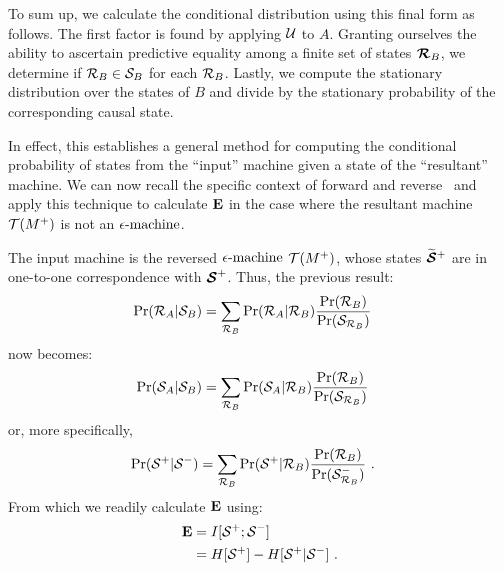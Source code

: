 To sum up, we calculate the conditional distribution using this final form as
follows. The first factor is found by applying $\mathcal{U}$ to $A$. Granting
ourselves the ability to ascertain predictive equality among a finite set of
states $\boldsymbol{\mathcal{R}}_B$, we determine if
$\mathcal{R}_B \in \mathcal{S}_B$ for each $\mathcal{R}_B$. Lastly,
we compute the stationary distribution over the states of $B$ and divide by
the stationary probability of the corresponding causal state.

In effect, this establishes a general method for computing the conditional
probability of states from the ``input'' machine given a state of the
``resultant'' machine. We can now recall the specific context of forward
and reverse \eMs\ and apply this technique to calculate ${\bf E}$ in the case
where the resultant machine $\mathcal{T}({M}^{+})$ is not an $\mbox{$\epsilon$-machine}$.

The input machine is the reversed $\mbox{$\epsilon$-machine}$ $\mathcal{T}({M}^{+})$, whose states
$\widetilde{\boldsymbol{\mathcal{S}}}{}^+$ are in one-to-one correspondence with
${\boldsymbol{\mathcal{S}}}^{+}$. Thus, the previous result:
\begin{align*}
\Pr(\mathcal{R}_A | \mathcal{S}_B)
  &= \sum_{\mathcal{R}_B}
  {\Pr(\mathcal{R}_A | \mathcal{R}_B)
  \frac{\Pr(\mathcal{R}_B)}{\Pr(\mathcal{S}_{\mathcal{R}_B})}}
\end{align*}
now becomes:
\begin{align*}
\Pr(\mathcal{S}_A | \mathcal{S}_B)
  &= \sum_{\mathcal{R}_B}{\Pr(\mathcal{S}_A | \mathcal{R}_B)
  \frac{\Pr(\mathcal{R}_B)}{\Pr(\mathcal{S}_{\mathcal{R}_B})}}
\end{align*}
or, more specifically,
\begin{align*}
\Pr({\mathcal{S}}^{+} | {\mathcal{S}}^{-})
  &= \sum_{\mathcal{R}_B}
  	\Pr({\mathcal{S}}^{+} | \mathcal{R}_B)
	\frac{\Pr(\mathcal{R}_B)}
	{\Pr({\mathcal{S}}^{-}_{\mathcal{R}_B})} ~.
\end{align*}
From which we readily calculate ${\bf E}$ using:
\begin{align*}
{\bf E} &= I[{\mathcal{S}}^{+}; {\mathcal{S}}^{-}] \\
    &= H[{\mathcal{S}}^{+}] - H[{\mathcal{S}}^{+} | {\mathcal{S}}^{-}] ~.
\end{align*}



\ifx\master\undefined\fi
